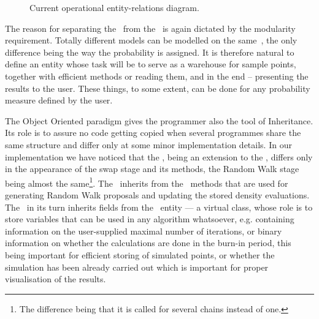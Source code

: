 \begin{figure}
	\caption{Current operational entity-relations diagram.}\label{objectStructure}
\end{figure}

The reason for separating the \measure\, from the \sspace\, is again dictated by the modularity requirement. Totally different models can be modelled on the same \sspace\,, the only difference being the way the probability is assigned. It is therefore natural to define an entity whose task will be to serve as a warehouse for sample points, together with efficient methods or reading them, and in the end -- presenting the results to the user. These things, to some extent, can be done for any probability measure defined by the user. 

The Object Oriented paradigm gives the programmer also the tool of Inheritance. Its role is to assure no code getting copied when several programmes share the same structure and differ only at some minor implementation details. In our implementation we have noticed that the \PTalgo, being an extension to the \MH, differs only in the appearance of the swap stage and its methods, the Random Walk stage being almost the same\footnote{The difference being that it is called for several chains instead of one.}. The \PTalgo\, inherits from the \MH\, methods that are used for generating Random Walk proposals and updating the stored density evaluations. The \MH\, in its turn inherits fields from the \algo\, entity --- a virtual class, whose role is to store variables that can be used in any algorithm whatsoever, e.g. containing information on the user-supplied maximal number of iterations, or binary information on whether the calculations are done in the burn-in period, this being important for efficient storing of simulated points, or whether the simulation has been already carried out which is important for proper visualisation of the results. 

